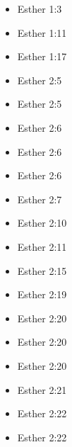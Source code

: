 \documentclass[14pt]{book}
\begin{document}
\begin{multicols}{2}\begin{itemize}
					
					\item Esther 1:3
					
					\item Esther 1:11
					
					\item Esther 1:17
					
					\item Esther 2:5
							
							\item Esther 2:5
							
							\item Esther 2:6
							
							\item Esther 2:6
							
							\item Esther 2:6
							
							\item Esther 2:7
							
							\item Esther 2:10
							
							\item Esther 2:11
							
							\item Esther 2:15
							
							\item Esther 2:19
							
							\item Esther 2:20
							
							\item Esther 2:20
							
							\item Esther 2:20
							
							\item Esther 2:21
							
							\item Esther 2:22
							
							\item Esther 2:22
							

\end{itemize}
\end{multicols}
\end{document}
